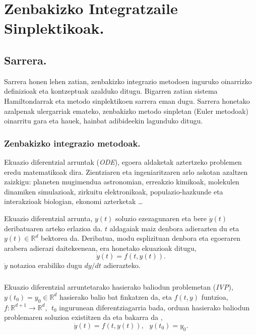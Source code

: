 \chapter{Zenbakizko Integratzaile Sinplektikoak.}

\section{Sarrera.}


Sarrera honen lehen zatian, zenbakizko integrazio metodoen inguruko oinarrizko definizioak eta kontzeptuak azalduko ditugu. 
Bigarren zatian sistema Hamiltondarrak eta metodo sinplektikoen sarrera eman dugu. Sarrera honetako azalpenak ulergarriak emateko, zenbakizko metodo sinpletan (Euler metodoak) oinarritu gara eta hauek, hainbat adibideekin lagunduko ditugu. 

\subsection{Zenbakizko integrazio metodoak.}

Ekuazio diferentzial arruntak (\emph{ODE}), egoera aldaketak aztertzeko problemen eredu matematikoak dira. Zientziaren eta ingeniaritzaren arlo askotan azaltzen zaizkigu: planeten mugimendua astronomian, erreakzio kimikoak, molekulen dinamiken simulazioak, zirkuitu elektronikoak, populazio-hazkunde eta interakzioak biologian, ekonomi azterketak \ldots  

Ekuazio diferentzial arrunta, $y(t)$ soluzio ezezagunaren eta bere $\dot{y}(t)$ deribatuaren arteko erlazioa da. $t$ aldagaiak maiz denbora adierazten du eta $y(t) \in \mathbb{R}^{d}$ bektorea da. Deribatua, modu esplizituan denbora eta egoeraren arabera  adierazi daitekeenean, era honetako ekuazioak ditugu,
\begin{equation}
 \label{eq:201}
\dot{y}(t)=f(t,y(t)). 
\end{equation} 
$\dot{y}$ notazioa erabiliko dugu $dy/dt$ adierazteko.

\paragraph*{} Ekuazio diferentzial arruntetarako hasierako baliodun problemetan (\emph{IVP}),~  $y(t_0)=y_0 \in \mathbb{R}^d$ hasierako balio bat finkatzen da, eta $f(t,y)$ funtzioa, $f: \mathbb{R}^{d+1} \longrightarrow \mathbb{R}^d, \ \ t_0$ ingurunean diferentziagarria bada, orduan hasierako baliodun problemaren soluzioa existitzen da eta bakarra da \cite{Hairer2006},
\begin{equation}
 \label{eq:ivp}
\dot{y}(t)=f(t,y(t)), \ \ \ y(t_0)=y_0.
\end{equation} 

